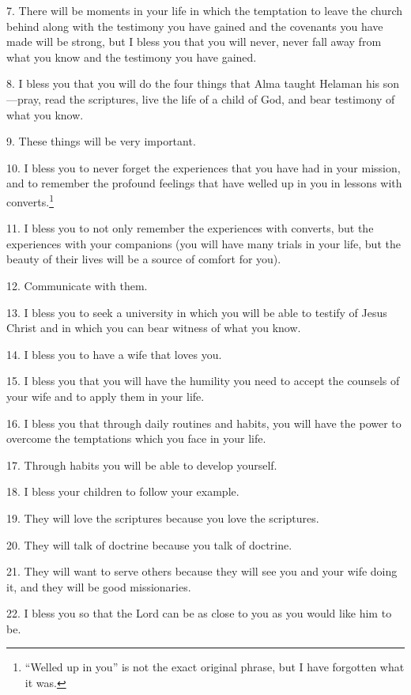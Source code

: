 			7. There will be moments in your life in which the temptation to leave the church behind along with the testimony you have gained and the covenants you have made will be strong, but I bless you that you will never, never fall away from what you know and the testimony you have gained.

			8. I bless you that you will do the four things that Alma taught Helaman his son---pray, read the scriptures, live the life of a child of God, and bear testimony of what you know.

			9. These things will be very important.

			10. I bless you to never forget the experiences that you have had in your mission, and to remember the profound feelings that have welled up in you in lessons with converts.\footnote{``Welled up in you'' is not the exact original phrase, but I have forgotten what it was.}

			11. I bless you to not only remember the experiences with converts, but the experiences with your companions (you will have many trials in your life, but the beauty of their lives will be a source of comfort for you).

			12. Communicate with them.

			13. I bless you to seek a university in which you will be able to testify of Jesus Christ and in which you can bear witness of what you know.

			14. I bless you to have a wife that loves you.

			15. I bless you that you will have the humility you need to accept the counsels of your wife and to apply them in your life.

			16. I bless you that through daily routines and habits, you will have the power to overcome the temptations which you face in your life.

			17. Through habits you will be able to develop yourself.

			18. I bless your children to follow your example.

			19. They will love the scriptures because you love the scriptures.

			20. They will talk of doctrine because you talk of doctrine.

			21. They will want to serve others because they will see you and your wife doing it, and they will be good missionaries.

			22. I bless you so that the Lord can be as close to you as you would like him to be.

